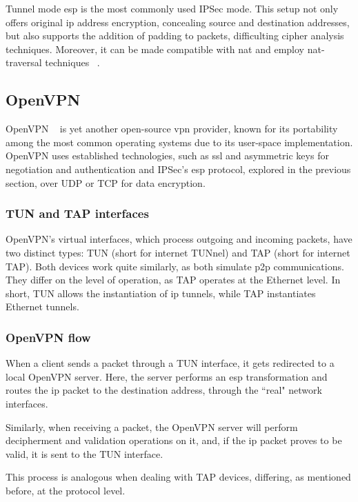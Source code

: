 \documentclass[11pt,twoside,a4paper]{report}
\begin{document}
Tunnel mode \ac{esp} is the most commonly used IPSec mode. This setup not only offers original \ac{ip} address encryption, concealing source and destination addresses, but also supports the addition of padding to packets, difficulting cipher analysis techniques. Moreover, it can be made compatible with \ac{nat} and employ \ac{nat}-traversal techniques ~\cite{nam2022high, singh2012nat}.

\subsection{OpenVPN}

OpenVPN ~\cite{ovpnwebsite} is yet another open-source \ac{vpn} provider, known for its portability among the most common operating systems due to its user-space implementation. OpenVPN uses established technologies, such as \ac{ssl} and asymmetric keys for negotiation and authentication and IPSec's \ac{esp} protocol, explored in the previous section, over UDP or TCP for data encryption.

\subsubsection{TUN and TAP interfaces}

OpenVPN's virtual interfaces, which process outgoing and incoming packets, have two distinct types: TUN (short for internet TUNnel) and TAP (short for internet TAP). Both devices work quite similarly, as both simulate \ac{p2p} communications. They differ on the level of operation, as TAP operates at the Ethernet level. In short, TUN allows the instantiation of \ac{ip} tunnels, while TAP instantiates Ethernet tunnels.

\subsubsection{OpenVPN flow}

When a client sends a packet through a TUN interface, it gets redirected to a local OpenVPN server. Here, the server performs an \ac{esp} transformation and routes the \ac{ip} packet to the destination address, through the ``real" network interfaces.

Similarly, when receiving a packet, the OpenVPN server will perform decipherment and validation operations on it, and, if the \ac{ip} packet proves to be valid, it is sent to the TUN interface.

This process is analogous when dealing with TAP devices, differing, as mentioned before, at the protocol level.
\end{document}
